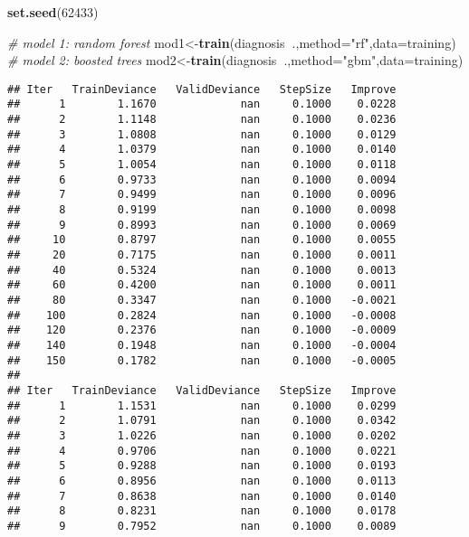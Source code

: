 \documentclass[]{article}
\newenvironment{Shaded}{\begin{snugshade}}{\end{snugshade}}
\newcommand{\KeywordTok}[1]{\textcolor[rgb]{0.13,0.29,0.53}{\textbf{#1}}}
\newcommand{\DataTypeTok}[1]{\textcolor[rgb]{0.13,0.29,0.53}{#1}}
\newcommand{\DecValTok}[1]{\textcolor[rgb]{0.00,0.00,0.81}{#1}}
\newcommand{\StringTok}[1]{\textcolor[rgb]{0.31,0.60,0.02}{#1}}
\newcommand{\CommentTok}[1]{\textcolor[rgb]{0.56,0.35,0.01}{\textit{#1}}}
\newcommand{\OperatorTok}[1]{\textcolor[rgb]{0.81,0.36,0.00}{\textbf{#1}}}
\newcommand{\NormalTok}[1]{#1}
\begin{document}
\begin{Shaded}
\begin{Highlighting}[]
\KeywordTok{set.seed}\NormalTok{(}\DecValTok{62433}\NormalTok{)}

\CommentTok{# model 1: random forest}
\NormalTok{mod1<-}\KeywordTok{train}\NormalTok{(diagnosis}\OperatorTok{~}\NormalTok{.,}\DataTypeTok{method=}\StringTok{"rf"}\NormalTok{,}\DataTypeTok{data=}\NormalTok{training)}
\CommentTok{# model 2: boosted trees}
\NormalTok{mod2<-}\KeywordTok{train}\NormalTok{(diagnosis}\OperatorTok{~}\NormalTok{.,}\DataTypeTok{method=}\StringTok{"gbm"}\NormalTok{,}\DataTypeTok{data=}\NormalTok{training)}
\end{Highlighting}
\end{Shaded}

\begin{verbatim}
## Iter   TrainDeviance   ValidDeviance   StepSize   Improve
##      1        1.1670             nan     0.1000    0.0228
##      2        1.1148             nan     0.1000    0.0236
##      3        1.0808             nan     0.1000    0.0129
##      4        1.0379             nan     0.1000    0.0140
##      5        1.0054             nan     0.1000    0.0118
##      6        0.9733             nan     0.1000    0.0094
##      7        0.9499             nan     0.1000    0.0096
##      8        0.9199             nan     0.1000    0.0098
##      9        0.8993             nan     0.1000    0.0069
##     10        0.8797             nan     0.1000    0.0055
##     20        0.7175             nan     0.1000    0.0011
##     40        0.5324             nan     0.1000    0.0013
##     60        0.4200             nan     0.1000    0.0011
##     80        0.3347             nan     0.1000   -0.0021
##    100        0.2824             nan     0.1000   -0.0008
##    120        0.2376             nan     0.1000   -0.0009
##    140        0.1948             nan     0.1000   -0.0004
##    150        0.1782             nan     0.1000   -0.0005
## 
## Iter   TrainDeviance   ValidDeviance   StepSize   Improve
##      1        1.1531             nan     0.1000    0.0299
##      2        1.0791             nan     0.1000    0.0342
##      3        1.0226             nan     0.1000    0.0202
##      4        0.9706             nan     0.1000    0.0221
##      5        0.9288             nan     0.1000    0.0193
##      6        0.8956             nan     0.1000    0.0113
##      7        0.8638             nan     0.1000    0.0140
##      8        0.8231             nan     0.1000    0.0178
##      9        0.7952             nan     0.1000    0.0089

\end{verbatim}
\end{document}
